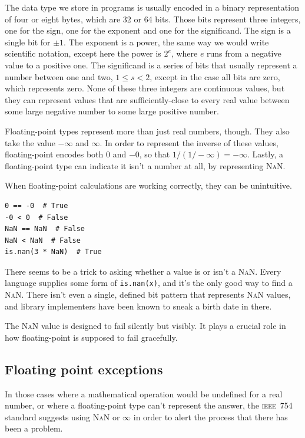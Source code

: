 \documentclass[fleqn,10pt]{olplainarticle}
\newcommand{\nan}{\textsc{NaN}\xspace}
\newcommand{\ieee}{\textsc{ieee}\xspace}
\begin{document}
The data type we store in programs is usually encoded in a binary representation
of four or eight bytes, which are 32 or 64 bits. Those bits represent three integers,
one for the sign, one for the exponent and one for the significand. The sign is
a single bit for $\pm 1$. The exponent is a power, the same way we would write
scientific notation, except here the power is $2^e$, where $e$ runs from a
negative value to a positive one. The significand is a series of bits that
usually represent a number between one and two, $1 \le s < 2$, except in the
case all bits are zero, which represents zero. None of these three
integers are continuous values, but they can represent values that are
sufficiently-close to every real value between some large negative number
to some large positive number.

Floating-point types represent more than just real numbers, though. They
also take the value $-\infty$ and $\infty$. In order to represent the inverse
of these values, floating-point encodes both $0$ and $-0$, so that $1/(1 / -\infty)=-\infty$.
Lastly, a floating-point type can indicate it isn't a number at all,
by representing \nan.

When floating-point calculations are working correctly, they can
be unintuitive.

\begin{lstlisting}
0 == -0  # True
-0 < 0  # False
NaN == NaN  # False
NaN < NaN  # False
is.nan(3 * NaN)  # True
\end{lstlisting}

There seems to be a trick to asking whether a value is
or isn't a \nan. Every language supplies some form of \lstinline|is.nan(x)|,
and it's the only good way to find a \nan. There isn't even a single,
defined bit pattern that represents \nan values, and library implementers
have been known to sneak a birth date in there.

The \nan value is designed to fail silently but visibly. It plays
a crucial role in how floating-point is supposed to fail gracefully.


\subsection{Floating point exceptions}

In those cases where a mathematical operation would be undefined
for a real number, or where a floating-point type can't represent
the answer, the \ieee~754 standard suggests using \nan or $\infty$ in order
to alert the process that there has been a problem.
\end{document}

